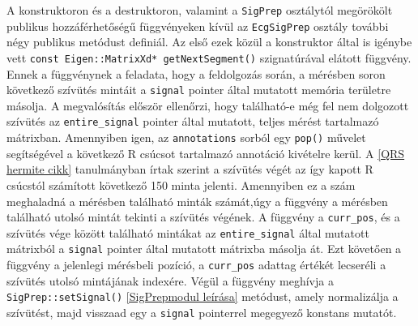 \documentclass[oneside,titlepage,12pt,a4paper]{report}
\begin{document}
\par A konstruktoron és a destruktoron, valamint a 
\texttt{SigPrep} osztálytól megörökölt publikus hozzáférhetőségű függvényeken kívül az
\texttt{EcgSigPrep} osztály további négy publikus metódust definiál. Az első ezek közül a konstruktor által is igénybe vett 
\texttt{const Eigen::MatrixXd* getNextSegment()} 
szignatúrával elátott függvény. Ennek a függvénynek a feladata, hogy a feldolgozás során, a mérésben soron következő szívütés mintáit a \texttt{signal} pointer által mutatott memória területre másolja. A megvalósítás először ellenőrzi, hogy található-e még fel nem dolgozott szívütés az 
\texttt{entire\_signal} pointer által mutatott, teljes mérést tartalmazó mátrixban. Amennyiben igen, az \texttt{annotations} sorból egy \texttt{pop()} 
művelet segítségével a következő R csúcsot tartalmazó annotáció kivételre kerül. A \ref{QRS hermite cikk} tanulmányban írtak szerint a szívütés végét az így kapott R csúcstól számított következő 150 minta jelenti. Amennyiben ez a szám meghaladná a mérésben található minták számát,úgy a függvény a mérésben található utolsó mintát tekinti a szívütés végének. A függvény a \texttt{curr\_pos}, és a szívütés vége között található mintákat az \texttt{entire\_signal} által mutatott mátrixból a \texttt{signal} pointer által mutatott mátrixba másolja át. Ezt követően a függvény a jelenlegi mérésbeli pozíció, a \texttt{curr\_pos} adattag értékét lecseréli a szívütés utolsó mintájának indexére. Végül a függvény meghívja a \texttt{SigPrep::setSignal()} \ref{SigPrepmodul leírása} metódust, amely normalizálja  a szívütést, majd visszaad egy a \texttt{signal} pointerrel megegyező konstans mutatót. 
\end{document}
